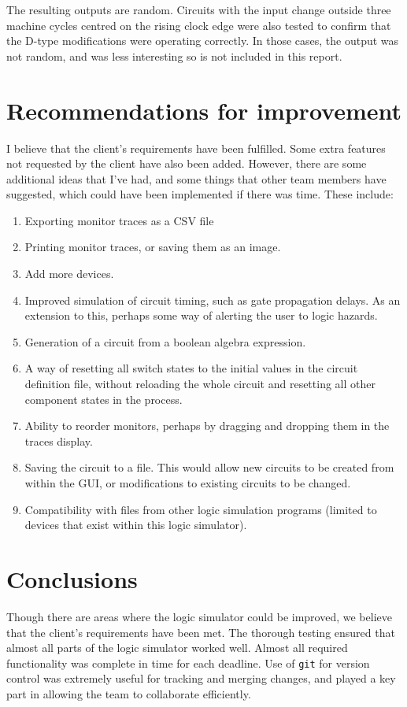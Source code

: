 \documentclass[a4paper,10pt]{article}
\begin{document}
The resulting outputs are random. Circuits with the input change outside three machine cycles centred on the rising clock edge were also tested to confirm that the D-type modifications were operating correctly. In those cases, the output was not random, and was less interesting so is not included in this report. 

\section{Recommendations for improvement}
I believe that the client's requirements have been fulfilled. Some extra features not requested by the client have also been added. However, there are some additional ideas that I've had, and some things that other team members have suggested, which could have been implemented if there was time. These include:

\begin{enumerate}
 \item Exporting monitor traces as a CSV file
 \item Printing monitor traces, or saving them as an image.
 \item Add more devices.
 \item Improved simulation of circuit timing, such as gate propagation delays. As an extension to this, perhaps some way of alerting the user to logic hazards. 
 \item Generation of a circuit from a boolean algebra expression.
 \item A way of resetting all switch states to the initial values in the circuit definition file, without reloading the whole circuit and resetting all other component states in the process.
 \item Ability to reorder monitors, perhaps by dragging and dropping them in the traces display.
 \item Saving the circuit to a file. This would allow new circuits to be created from within the GUI, or modifications to existing circuits to be changed.
 \item Compatibility with files from other logic simulation programs (limited to devices that exist within this logic simulator).
\end{enumerate}


\section{Conclusions}
Though there are areas where the logic simulator could be improved, we believe that the client's requirements have been met. The thorough testing ensured that almost all parts of the logic simulator worked well. Almost all required functionality was complete in time for each deadline. Use of \texttt{git} for version control was extremely useful for tracking and merging changes, and played a key part in allowing the team to collaborate efficiently. 
\end{document}
